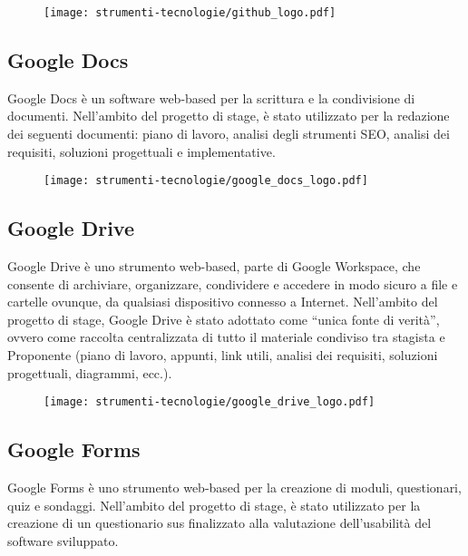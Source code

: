 \begin{figure}[H]
    \centering 
    \texttt{[image: strumenti-tecnologie/github\_logo.pdf]} 
\end{figure}

\subsection*{Google Docs}

\par Google Docs è un software web-based per la scrittura e la condivisione di documenti. Nell’ambito del progetto di stage, è stato utilizzato per la redazione dei seguenti documenti: piano di lavoro, analisi degli strumenti SEO, analisi dei requisiti, soluzioni progettuali e implementative.

\begin{figure}[H]
    \centering 
    \texttt{[image: strumenti-tecnologie/google\_docs\_logo.pdf]} 
\end{figure}

\subsection*{Google Drive}

\par Google Drive è uno strumento web-based, parte di Google Workspace, che consente di archiviare, organizzare, condividere e accedere in modo sicuro a file e cartelle ovunque, da qualsiasi dispositivo connesso a Internet. Nell’ambito del progetto di stage, Google Drive è stato adottato come “unica fonte di verità”, ovvero come raccolta centralizzata di tutto il materiale condiviso tra stagista e Proponente (piano di lavoro, appunti, link utili, analisi dei requisiti, soluzioni progettuali, diagrammi, ecc.).

\begin{figure}[H]
    \centering 
    \texttt{[image: strumenti-tecnologie/google\_drive\_logo.pdf]} 
\end{figure}

\subsection*{Google Forms}

\par Google Forms è uno strumento web-based per la creazione di moduli, questionari, quiz e sondaggi. Nell’ambito del progetto di stage, è stato utilizzato per la creazione di un questionario \gls{sus} finalizzato alla valutazione dell’usabilità del software sviluppato.

